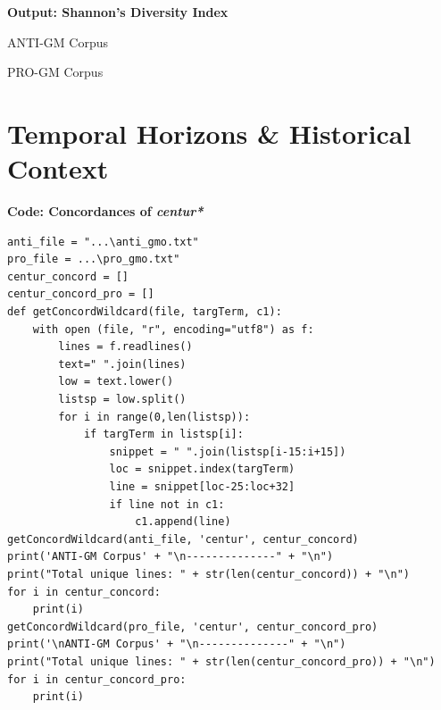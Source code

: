 \textbf{Output:  Shannon's Diversity Index}
\begin{footnotesize}


ANTI-GM Corpus

PRO-GM Corpus

\end{footnotesize}


\section{Temporal Horizons \& Historical Context}

\textbf{Code: Concordances of \textit{centur*}}

\begin{lstlisting}
anti_file = "...\anti_gmo.txt"
pro_file = ...\pro_gmo.txt"
centur_concord = []
centur_concord_pro = []
def getConcordWildcard(file, targTerm, c1):
    with open (file, "r", encoding="utf8") as f:
        lines = f.readlines()
        text=" ".join(lines)
        low = text.lower()
        listsp = low.split()
        for i in range(0,len(listsp)):
            if targTerm in listsp[i]:
                snippet = " ".join(listsp[i-15:i+15])
                loc = snippet.index(targTerm)
                line = snippet[loc-25:loc+32]
                if line not in c1:
                    c1.append(line)
getConcordWildcard(anti_file, 'centur', centur_concord)
print('ANTI-GM Corpus' + "\n--------------" + "\n")                     
print("Total unique lines: " + str(len(centur_concord)) + "\n")
for i in centur_concord:
    print(i)
getConcordWildcard(pro_file, 'centur', centur_concord_pro)
print('\nANTI-GM Corpus' + "\n--------------" + "\n")                     
print("Total unique lines: " + str(len(centur_concord_pro)) + "\n")
for i in centur_concord_pro:
    print(i)
\end{lstlisting}

